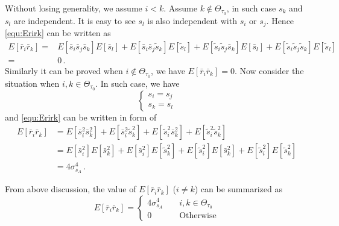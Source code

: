 Without losing generality, we assume $i < k$. Assume $k \notin \Theta_{\tau_0}$, in such case $s_k$ and $s_l$ are independent. It is easy to see $s_l$ is also independent with $s_i$ or $s_j$. Hence \eqref{equ:Erirk} can be written as
\begin{equation}
  \begin{split}
  E[\bar{r}_i\bar{r}_k] = &E[\bar{s}_i\bar{s}_j\bar{s}_k]E[\bar{s}_l] + E[\bar{s}_i\bar{s}_j\tilde{s}_k]E[\tilde{s}_l] + E[\tilde{s}_i\tilde{s}_j\bar{s}_k]E[\bar{s}_l] + E[\tilde{s}_i\tilde{s}_j\tilde{s}_k]E[\tilde{s}_l]\\
  = &0\,.
\end{split}
  \label{equ:Erirksitu1}
\end{equation} 
Similarly it can be proved when $i \notin \Theta_{\tau_0}$, we have $E[\bar{r}_i\bar{r}_k] =0$. Now consider the situation when $i, k \in \Theta_{\tau_0}$. In such case, we have 
\begin{equation}
  \begin{cases}
    s_i = s_j\\
    s_k = s_l
  \end{cases}
\end{equation}
and \eqref{equ:Erirk} can be written in form of
\begin{equation}
  \begin{split}
    E[\bar{r}_i\bar{r}_k] &= E[\bar{s}_i^2\bar{s}_k^2] + E[\bar{s}_i^2\tilde{s}_k^2]  +E[\tilde{s}_i^2\bar{s}_k^2] + E[\tilde{s}_i^2\tilde{s}_k^2] \\
    &= E[\bar{s}_i^2]E[\bar{s}_k^2] + E[\bar{s}_i^2]E[\tilde{s}_k^2]  +E[\tilde{s}_i^2]E[\bar{s}_k^2] + E[\tilde{s}_i^2]E[\tilde{s}_k^2] \\
    &= 4\sigma_{s_A}^4\,.
  \end{split}
  \label{Eririsitu2}
\end{equation}

From above discussion, the value of $E[\bar{r}_i\bar{r}_k]$  ($i \neq k$) can be summarized as
\begin{equation}
  E[\bar{r}_i\bar{r}_k] =  \begin{cases}
    4\sigma_{s_A}^4 \;\;\;\;&i, k \in \Theta_{\tau_0}\\
    0\;\;\;\;&\text{Otherwise}
  \end{cases}
  \label{Er_ir_j}
\end{equation}

